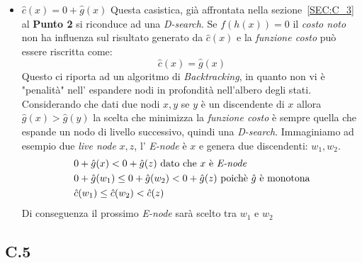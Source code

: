 \documentclass[a4paper]{article}
\begin{document}
\begin{itemize}
	\item $\hat c(x) = 0 + \hat g(x)$ Questa casistica, già affrontata nella sezione~\ref{SEC:C_3} al \textbf{Punto 2} si riconduce ad una \textit{D-search}.
		Se $f(h(x)) =0$ il \textit{costo noto} non ha influenza sul risultato generato da $\hat c(x)$ e la \textit{funzione costo} può essere riscritta come: $$\hat c(x) = \hat g(x)$$
Questo ci riporta ad un algoritmo di \textit{Backtracking}, in quanto non vi è "penalità" nell' espandere nodi in profondità nell'albero degli stati.
Considerando che dati due nodi $x,y$ se $y$ è un discendente di $x$ allora $\hat g(x) > \hat g(y)$ la scelta che minimizza la \textit{funzione costo} è sempre quella che espande un nodo di livello successivo, quindi una \textit{D-search}.
Immaginiamo ad esempio due \textit{live node} $x,z$, l' \textit{E-node} è $x$ e genera due discendenti: $w_1, w_2$.
                \begin{align}
                        &0 + \hat g(x) < 0 + \hat g(z) \text{ dato che $x$ è \textit{E-node}} \notag \\
                        &0 + \hat g(w_1) \leq 0 + \hat g(w_2) < 0 + \hat g(z) \text{ poichè $\hat g$ è monotona} \notag\\
                        &\hat c(w_1) \leq \hat c(w_2) < \hat c(z) \notag
                \end{align}
Di conseguenza il prossimo \textit{E-node} sarà scelto tra $w_1$ e $w_2$

\end{itemize}
\subsection{C.5}
\end{document}
